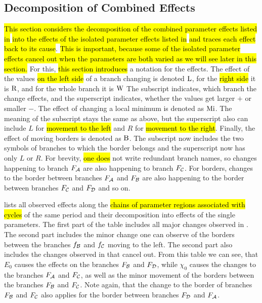 \subsection{Decomposition of Combined Effects}
\label{sec:yunus.param.effects.decomposition}

\hl{This section considers the decomposition of the combined parameter effects listed in}  \hl{into the effects of the isolated parameter effects listed in}  \hl{and traces each effect back to its cause}.
\hl{
	This is important, because some of the isolated parameter effects cancel out when the parameters are both varied as we will see later in this section.
}
For this, \hl{this section introduces} a notation for the effects.
The effect of the values \hl{on the left side} of a branch changing is denoted $\operatorname{L}$, for the \hl{right side} it is $\operatorname{R}$, and for the whole branch it is $\operatorname{W}$
The subscript indicates, which branch the change effects, and the superscript indicates, whether the values get larger $+$ or smaller $-$.
The effect of changing a local minimum is denoted as $\operatorname{Mi}$.
The meaning of the subscript stays the same as above, but the superscript also can include $L$ for \hl{movement to the left} and $R$ for \hl{movement to the right}.
Finally, the effect of moving borders is denoted as $\operatorname{B}$.
The subscript now includes the two symbols of branches to which the border belongs and the superscript now has only $L$ or $R$.
For brevity, \hl{one does} not write redundant branch names, so changes happening to branch $F_{\mathcal{A}}$ are also happening to branch $F_{\mathcal{C}}$.
For borders, changes to the border between branches $F_{\mathcal{A}}$ and $F_{\mathcal{B}}$ are also happening to the border between branches $F_{\mathcal{C}}$ and $F_{\mathcal{D}}$ and so on.

 lists all observed effects along the \hl{chains of parameter regions associated with cycles} of the same period and their decomposition into effects of the single parameters.
The first part of the table includes all major changes observed in .
The second part includes the minor change one can observe of the borders between the branches $f_{\mathcal{B}}$ and $f_{\mathcal{C}}$ moving to the left.
The second part also includes the changes observed in  that cancel out.
From this table we can see, that $E_0$ causes the effects on the branches $F_{\mathcal{B}}$ and $F_{\mathcal{D}}$, while $\chi_0$ causes the changes to the branches $F_{\mathcal{A}}$ and $F_{\mathcal{C}}$, as well as the minor movement of the borders between the branches $F_{\mathcal{B}}$ and $F_{\mathcal{C}}$.
Note again, that the change to the border of branches $F_{\mathcal{B}}$ and $F_{\mathcal{C}}$ also applies for the border between branches $F_{\mathcal{D}}$ and $F_{\mathcal{A}}$.

